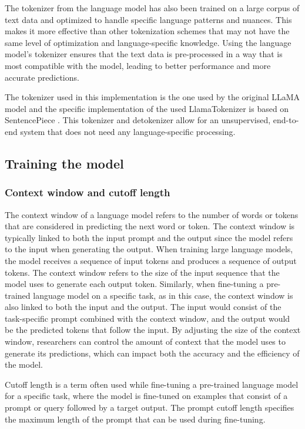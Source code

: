         The tokenizer from the language model has also been trained on a large corpus of text data and optimized to handle specific language patterns and nuances. This makes it more effective than other tokenization schemes that may not have the same level of optimization and language-specific knowledge. Using the language model's tokenizer ensures that the text data is pre-processed in a way that is most compatible with the model, leading to better performance and more accurate predictions.

        The tokenizer used in this implementation is the one used by the original LLaMA model \cite{touvronLLaMAOpenEfficient2023} and the specific implementation of the used LlamaTokenizer is based on SentencePiece \cite{LLaMATokenizer, Sentencepiece}. This tokenizer and detokenizer allow for an unsupervised, end-to-end system that does not need any language-specific processing. 
        
        
        \subsection{Training the model}
        \subsubsection{Context window and cutoff length}
        \label{sec:3_cutoff}
        The context window of a language model refers to the number of words or tokens that are considered in predicting the next word or token. The context window is typically linked to both the input prompt and the output since the model refers to the input when generating the output. When training large language models, the model receives a sequence of input tokens and produces a sequence of output tokens. The context window refers to the size of the input sequence that the model uses to generate each output token. Similarly, when fine-tuning a pre-trained language model on a specific task, as in this case, the context window is also linked to both the input and the output. The input would consist of the task-specific prompt combined with the context window, and the output would be the predicted tokens that follow the input. By adjusting the size of the context window, researchers can control the amount of context that the model uses to generate its predictions, which can impact both the accuracy and the efficiency of the model.

        Cutoff length is a term often used while fine-tuning a pre-trained language model for a specific task, where the model is fine-tuned on examples that consist of a prompt or query followed by a target output. The prompt cutoff length specifies the maximum length of the prompt that can be used during fine-tuning.

